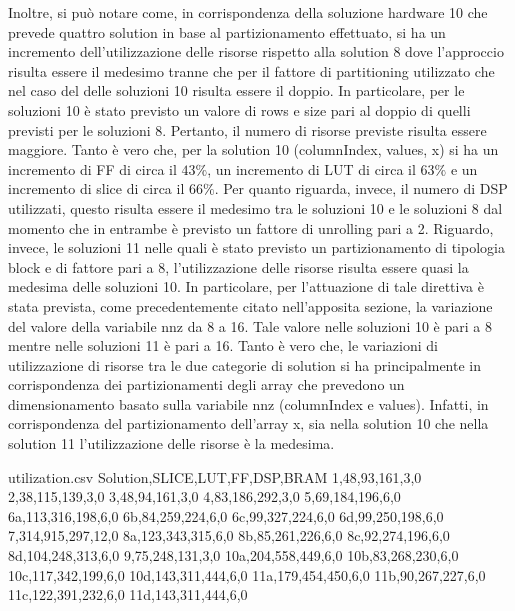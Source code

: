 Inoltre, si può notare come, in corrispondenza della soluzione hardware 10 che prevede quattro solution in base al partizionamento effettuato, si ha un incremento dell'utilizzazione delle risorse rispetto alla solution 8 dove l'approccio risulta essere il medesimo tranne che per il fattore di partitioning utilizzato che nel caso del delle soluzioni 10 risulta essere il doppio. In particolare, per le soluzioni 10 è stato previsto un valore di rows e size pari al doppio di quelli previsti per le soluzioni 8. Pertanto, il numero di risorse previste risulta essere maggiore. Tanto è vero che, per la solution 10 (columnIndex, values, x) si ha un incremento di FF di circa il $43\%$, un incremento di LUT di circa il $63\%$ e un incremento di slice di circa il $66\%$. Per quanto riguarda, invece, il numero di DSP utilizzati, questo risulta essere il medesimo tra le soluzioni 10 e le soluzioni 8 dal momento che in entrambe è previsto un fattore di unrolling pari a 2. Riguardo, invece, le soluzioni 11 nelle quali è stato previsto un partizionamento di tipologia block e di fattore pari a 8, l'utilizzazione delle risorse risulta essere quasi la medesima delle soluzioni 10. In particolare, per l'attuazione di tale direttiva è stata prevista, come precedentemente citato nell'apposita sezione, la variazione del valore della variabile nnz da 8 a 16. Tale valore nelle soluzioni 10 è pari a 8 mentre nelle soluzioni 11 è pari a 16. Tanto è vero che, le variazioni di utilizzazione di risorse tra le due categorie di solution si ha principalmente in corrispondenza dei partizionamenti degli array che prevedono un dimensionamento basato sulla variabile nnz (columnIndex e values). Infatti, in corrispondenza del partizionamento dell'array x, sia nella solution 10 che nella solution 11 l'utilizzazione delle risorse è la medesima. 

\begin{filecontents}{utilization.csv}
	Solution,SLICE,LUT,FF,DSP,BRAM
	1,48,93,161,3,0
	2,38,115,139,3,0
	3,48,94,161,3,0
	4,83,186,292,3,0
	5,69,184,196,6,0
	6a,113,316,198,6,0
	6b,84,259,224,6,0
	6c,99,327,224,6,0
	6d,99,250,198,6,0
	7,314,915,297,12,0
	8a,123,343,315,6,0
	8b,85,261,226,6,0
	8c,92,274,196,6,0
	8d,104,248,313,6,0
	9,75,248,131,3,0
	10a,204,558,449,6,0
	10b,83,268,230,6,0
	10c,117,342,199,6,0
	10d,143,311,444,6,0
	11a,179,454,450,6,0
	11b,90,267,227,6,0
	11c,122,391,232,6,0
	11d,143,311,444,6,0
\end{filecontents}


